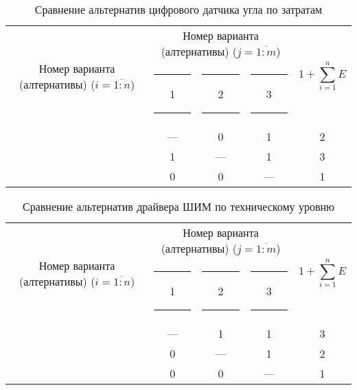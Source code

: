 \begin{table}[H]
    \centering
    \begin{tabular}{|c|c|c|c|c|}
        \hline
        \multirow{2}{2.4cm}[-0.5pc]{
            \centering
            Номер варианта (алтернативы) ($i = \overline{1:n}$)
        } &
        \multicolumn{3}{c|}{
            \parbox[t]{2.4cm}{
                \centering
                Номер варианта (алтернативы) ($j = \overline{1:m}$)
            }
        } &
        \multirow{2}{1.7cm}{
            \centering
            $$1 + \sum_{i=1}^n E$$
        } \\
        &
        \centering \rule{2pt}{0pt} 1 \rule{2pt}{0pt} &
        \centering \rule{2pt}{0pt} 2 \rule{2pt}{0pt} &
        \centering \rule{2pt}{0pt} 3 \rule{2pt}{0pt} & \\
        \hline \hline
        \centering{1} &---& 0 & 1 & 2 \\ \hline
        \centering{2} & 1 &---& 1 & 3 \\ \hline
        \centering{3} & 0 & 0 &---& 1 \\ \hline
    \end{tabular}
    \caption{Сравнение альтернатив цифрового датчика угла по затратам}
    \label{tbl_sensor_cost_lvl_comparison}
\end{table}

\begin{table}[H]
    \centering
    \begin{tabular}{|c|c|c|c|c|}
        \hline
        \multirow{2}{2.4cm}[-0.5pc]{
            \centering
            Номер варианта (алтернативы) ($i = \overline{1:n}$)
        } &
        \multicolumn{3}{c|}{
            \parbox[t]{2.4cm}{
                \centering
                Номер варианта (алтернативы) ($j = \overline{1:m}$)
            }
        } &
        \multirow{2}{1.7cm}{
            \centering
            $$1 + \sum_{i=1}^n E$$
        } \\
        &
        \centering \rule{2pt}{0pt} 1 \rule{2pt}{0pt} &
        \centering \rule{2pt}{0pt} 2 \rule{2pt}{0pt} &
        \centering \rule{2pt}{0pt} 3 \rule{2pt}{0pt} & \\
        \hline \hline
        \centering{1} &---& 1 & 1 & 3 \\ \hline
        \centering{2} & 0 &---& 1 & 2 \\ \hline
        \centering{3} & 0 & 0 &---& 1 \\ \hline
    \end{tabular}
    \caption{Сравнение альтернатив драйвера ШИМ по техническому уровню}
    \label{tbl_drv_tech_lvl_comparison}
\end{table}

